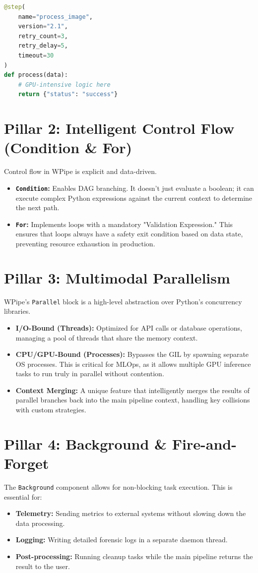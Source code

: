 \documentclass[12pt,a4paper]{report}
\begin{document}
\begin{lstlisting}[language=Python, caption=Advanced Step Definition]
@step(
    name="process_image",
    version="2.1",
    retry_count=3,
    retry_delay=5,
    timeout=30
)
def process(data):
    # GPU-intensive logic here
    return {"status": "success"}
\end{lstlisting}

\cleardoublepage
\section{Pillar 2: Intelligent Control Flow (Condition & For)}
Control flow in WPipe is explicit and data-driven.
\begin{itemize}
    \item \textbf{\texttt{Condition}:} Enables DAG branching. It doesn't just evaluate a boolean; it can execute complex Python expressions against the current context to determine the next path.
    \item \textbf{\texttt{For}:} Implements loops with a mandatory "Validation Expression." This ensures that loops always have a safety exit condition based on data state, preventing resource exhaustion in production.
\end{itemize}

\section{Pillar 3: Multimodal Parallelism}
WPipe's \texttt{Parallel} block is a high-level abstraction over Python's concurrency libraries.
\begin{itemize}
    \item \textbf{I/O-Bound (Threads):} Optimized for API calls or database operations, managing a pool of threads that share the memory context.
    \item \textbf{CPU/GPU-Bound (Processes):} Bypasses the GIL by spawning separate OS processes. This is critical for MLOps, as it allows multiple GPU inference tasks to run truly in parallel without contention.
    \item \textbf{Context Merging:} A unique feature that intelligently merges the results of parallel branches back into the main pipeline context, handling key collisions with custom strategies.
\end{itemize}

\section{Pillar 4: Background & Fire-and-Forget}
The \texttt{Background} component allows for non-blocking task execution. This is essential for:
\begin{itemize}
    \item \textbf{Telemetry:} Sending metrics to external systems without slowing down the data processing.
    \item \textbf{Logging:} Writing detailed forensic logs in a separate daemon thread.
    \item \textbf{Post-processing:} Running cleanup tasks while the main pipeline returns the result to the user.
\end{itemize}
\end{document}
